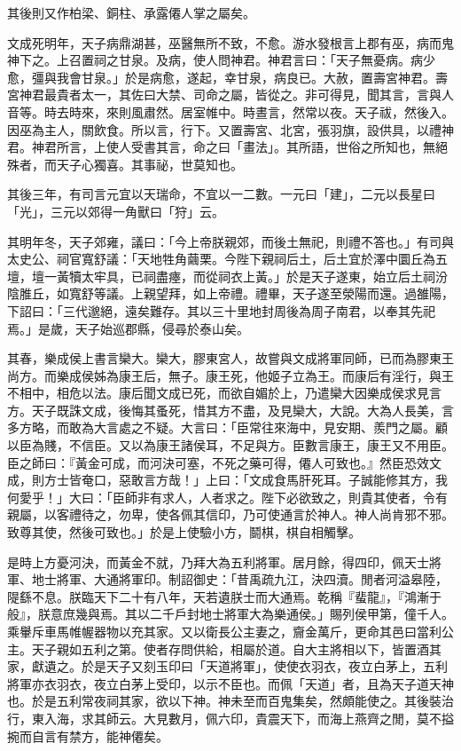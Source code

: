 \begin{pinyinscope}
其後則又作柏梁、銅柱、承露僊人掌之屬矣。

文成死明年，天子病鼎湖甚，巫醫無所不致，不愈。游水發根言上郡有巫，病而鬼神下之。上召置祠之甘泉。及病，使人問神君。神君言曰：「天子無憂病。病少愈，彊與我會甘泉。」於是病愈，遂起，幸甘泉，病良已。大赦，置壽宮神君。壽宮神君最貴者太一，其佐曰大禁、司命之屬，皆從之。非可得見，聞其言，言與人音等。時去時來，來則風肅然。居室帷中。時晝言，然常以夜。天子祓，然後入。因巫為主人，關飲食。所以言，行下。又置壽宮、北宮，張羽旗，設供具，以禮神君。神君所言，上使人受書其言，命之曰「畫法」。其所語，世俗之所知也，無絕殊者，而天子心獨喜。其事祕，世莫知也。

其後三年，有司言元宜以天瑞命，不宜以一二數。一元曰「建」，二元以長星曰「光」，三元以郊得一角獸曰「狩」云。

其明年冬，天子郊雍，議曰：「今上帝朕親郊，而後土無祀，則禮不答也。」有司與太史公、祠官寬舒議：「天地牲角繭栗。今陛下親祠后土，后土宜於澤中圜丘為五壇，壇一黃犢太牢具，已祠盡瘞，而從祠衣上黃。」於是天子遂東，始立后土祠汾陰脽丘，如寬舒等議。上親望拜，如上帝禮。禮畢，天子遂至滎陽而還。過雒陽，下詔曰：「三代邈絕，遠矣難存。其以三十里地封周後為周子南君，以奉其先祀焉。」是歲，天子始巡郡縣，侵尋於泰山矣。

其春，樂成侯上書言欒大。欒大，膠東宮人，故嘗與文成將軍同師，已而為膠東王尚方。而樂成侯姊為康王后，無子。康王死，他姬子立為王。而康后有淫行，與王不相中，相危以法。康后聞文成已死，而欲自媚於上，乃遣欒大因樂成侯求見言方。天子既誅文成，後悔其蚤死，惜其方不盡，及見欒大，大說。大為人長美，言多方略，而敢為大言處之不疑。大言曰：「臣常往來海中，見安期、羨門之屬。顧以臣為賤，不信臣。又以為康王諸侯耳，不足與方。臣數言康王，康王又不用臣。臣之師曰：『黃金可成，而河決可塞，不死之藥可得，僊人可致也。』然臣恐效文成，則方士皆奄口，惡敢言方哉！」上曰：「文成食馬肝死耳。子誠能修其方，我何愛乎！」大曰：「臣師非有求人，人者求之。陛下必欲致之，則貴其使者，令有親屬，以客禮待之，勿卑，使各佩其信印，乃可使通言於神人。神人尚肯邪不邪。致尊其使，然後可致也。」於是上使驗小方，鬬棋，棋自相觸擊。

是時上方憂河決，而黃金不就，乃拜大為五利將軍。居月餘，得四印，佩天士將軍、地士將軍、大通將軍印。制詔御史：「昔禹疏九江，決四瀆。閒者河溢皋陸，隄繇不息。朕臨天下二十有八年，天若遺朕士而大通焉。乾稱『蜚龍』，『鴻漸于般』，朕意庶幾與焉。其以二千戶封地士將軍大為樂通侯。」賜列侯甲第，僮千人。乘轝斥車馬帷幄器物以充其家。又以衛長公主妻之，齎金萬斤，更命其邑曰當利公主。天子親如五利之第。使者存問供給，相屬於道。自大主將相以下，皆置酒其家，獻遺之。於是天子又刻玉印曰「天道將軍」，使使衣羽衣，夜立白茅上，五利將軍亦衣羽衣，夜立白茅上受印，以示不臣也。而佩「天道」者，且為天子道天神也。於是五利常夜祠其家，欲以下神。神未至而百鬼集矣，然頗能使之。其後裝治行，東入海，求其師云。大見數月，佩六印，貴震天下，而海上燕齊之閒，莫不搤捥而自言有禁方，能神僊矣。


\end{pinyinscope}
